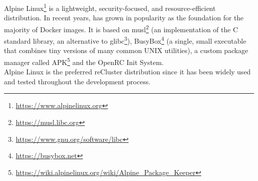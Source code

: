 Alpine Linux\footnote{\url{https://www.alpinelinux.org}} is a lightweight, security-focused,
and resource-efficient distribution. In recent years, has grown in popularity as
the foundation for the majority of Docker images. It is based on musl\footnote{\url{https://musl.libc.org}}
(an implementation of the C standard library, an alternative to glibc\footnote{\url{https://www.gnu.org/software/libc}}),
BusyBox\footnote{\url{https://busybox.net}} (a single, small executable that combines
tiny versions of many common UNIX utilities), a custom package manager called APK\footnote{\url{https://wiki.alpinelinux.org/wiki/Alpine_Package_Keeper}}
and the OpenRC Init System\cite{alpine_linux}. \\ %
Alpine Linux is the preferred reCluster distribution since it has been widely
used and tested throughout the development process.

